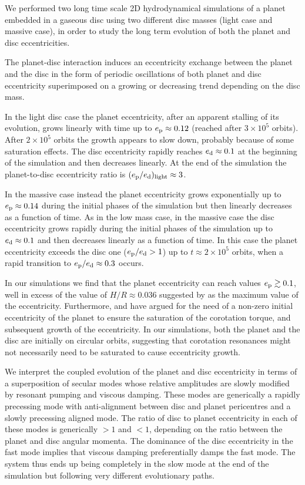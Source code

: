 \documentclass[usenatbib,a4paper,times,fleqn]{mnras}
\begin{document}
We performed two long time scale 2D hydrodynamical simulations of a planet embedded in a gaseous disc using two different disc masses (light case and massive case), in order to study the long term evolution of both the planet and disc eccentricities.

The planet-disc interaction induces an eccentricity exchange between the planet and the disc in the form of periodic oscillations of both planet and disc eccentricity superimposed on a growing or decreasing trend depending on the disc mass. 

In the light disc case the planet eccentricity, after an apparent stalling of its evolution, grows linearly with time up to $e_{\rm p}\approx 0.12$ (reached after $3\times 10^5$ orbits). After $2\times 10^5$ orbits the growth appears to slow down, probably because of some saturation effects. The disc eccentricity rapidly reaches $e_{\rm d}\approx 0.1$ at the beginning of the simulation and then decreases linearly. At the end of the simulation the planet-to-disc eccentricity ratio is $(e_{\rm p}/e_{\rm d})_{\rm light}\approx 3$.

In the massive case instead the planet eccentricity grows exponentially up to $e_{\rm p}\approx 0.14$ during the initial phases of the simulation but then linearly decreases as a function of time. As in the low mass case, in the massive case the disc eccentricity grows rapidly during the initial phases of the simulation up to $e_{\rm d}\approx 0.1$ and then decreases linearly as a function of time. In this case the planet eccentricity exceeds the disc one ($e_{\rm p}/e_{\rm d}>1$) up to $t\approx 2\times 10^5$ orbits, when a rapid transition to $e_{\rm p}/e_{\rm d}\approx 0.3$ occurs. 

In our simulations we find that the planet eccentricity can reach values $e_{\rm p}\gtrsim 0.1$, well in excess of the value of $H/R\approx 0.036$ suggested by \citet{duffell2015} as the maximum value of the eccentricity. Furthermore, \citet{goldreich2003} and \citet{duffell2015} have argued for the need of a non-zero initial eccentricity of the planet to ensure the saturation of the corotation torque, and subsequent growth of the eccentricity. In our simulations, both the planet and the disc are initially on circular orbits, suggesting that corotation resonances might not necessarily need to be saturated to cause eccentricity growth.

We interpret the coupled evolution of the planet and disc eccentricity in terms of a superposition of secular modes whose relative amplitudes are slowly modified by resonant pumping and viscous damping. These modes are generically a rapidly precessing mode with anti-alignment between disc and planet pericentres and a slowly precessing aligned mode. The ratio of disc to planet eccentricity in each of these modes is generically $>1$ and $<1$, depending on the ratio between the planet and disc angular momenta. The dominance of the disc eccentricity in the fast mode implies that viscous damping preferentially damps the fast mode. The system thus ends up being completely in the slow mode at the end of the simulation but following very different evolutionary paths.
\end{document}
